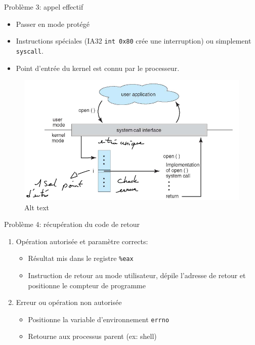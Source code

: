 Problème 3: appel effectif

\begin{itemize}
\tightlist
\item
  Passer en mode protégé
\item
  Instructions spéciales (IA32 \texttt{int\ 0x80} crée une interruption)
  ou simplement \texttt{syscall}.
\item
  Point d'entrée du kernel est connu par le processeur.
\end{itemize}

\begin{figure}
\centering
\includegraphics{image-13.png}
\caption{Alt text}
\end{figure}

Problème 4: récupération du code de retour

\begin{enumerate}
\def\labelenumi{\arabic{enumi}.}
\tightlist
\item
  Opération autorisée et paramètre corrects:

  \begin{itemize}
  \tightlist
  \item
    Résultat mis dans le registre \texttt{\%eax}
  \item
    Instruction de retour au mode utilisateur, dépile l'adresse de
    retour et positionne le compteur de programme
  \end{itemize}
\item
  Erreur ou opération non autorisée

  \begin{itemize}
  \tightlist
  \item
    Positionne la variable d'environnement \texttt{errno}
  \item
    Retourne aux processus parent (ex: shell)
  \end{itemize}
\end{enumerate}

